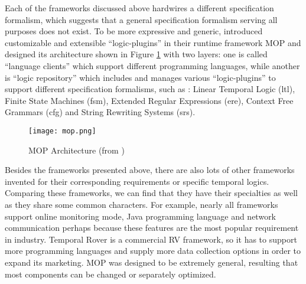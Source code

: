 Each of the frameworks discussed above hardwires a different specification formalism, which suggests that a general specification formalism serving all purposes does not exist. To be more expressive and generic, \cite{chen2007mop} introduced customizable and extensible ``logic-plugins'' in their runtime framework MOP and designed its architecture shown in Figure \ref{img:mop} with two layers: one is called ``language clients'' which support different programming languages, while another is ``logic repository'' which includes and manages various ``logic-plugins'' to support different specification formalisms, such as : Linear Temporal Logic (ltl), Finite State Machines (fsm), Extended Regular Expressions (ere), Context Free Grammars (cfg) and String Rewriting Systems (srs).

\begin{figure}[h]
\begin{center}
\centering
\texttt{[image: mop.png]}
\caption{MOP Architecture (from \cite{chen2007mop})}
\label{img:mop}
\end{center}
\end{figure}

Besides the frameworks presented above, there are also lots of other frameworks invented for their corresponding requirements or specific temporal logics. Comparing these frameworks, we can find that they have their specialties as well as they share some common characters. For example, nearly all frameworks support online monitoring mode, Java programming language and network communication perhaps because these features are the most popular requirement in industry. Temporal Rover is a commercial RV framework, so it has to support more programming languages and supply more data collection options in order to expand its marketing. MOP was designed to be extremely general, resulting that most components can be changed or separately optimized.
